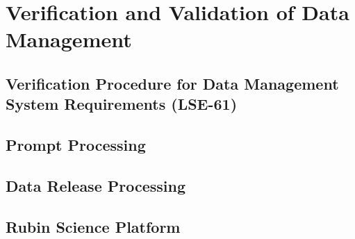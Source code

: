 \section{Verification and Validation of Data Management}  \label{sec:dm}


\subsection{Verification Procedure for Data Management System Requirements (LSE-61)}


\subsection{Prompt Processing}


\subsection{Data Release Processing}


\subsection{Rubin Science Platform}
